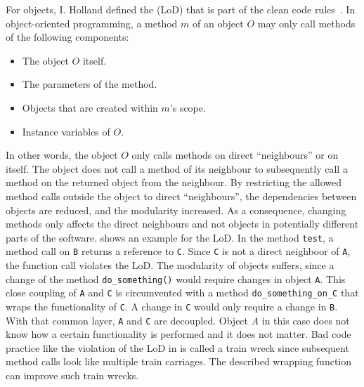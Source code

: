 For objects, I. Holland defined the  (LoD) that is part of the clean code rules~\cite{lieberherr_assuring_1989}.
In object-oriented programming, a method $m$ of an object $O$ may only call methods of the following components:
\begin{itemize}
    \item The object $O$ itself.
    \item The parameters of the method.
    \item Objects that are created within $m$'s scope.
    \item Instance variables of $O$.
\end{itemize}
In other words, the object $O$ only calls methods on direct \enquote{neighbours} or on itself. The object does not call a method of its neighbour to subsequently call a method on the returned object from the neighbour. By restricting the allowed method calls outside the object to direct \enquote{neighbours}, the dependencies between objects are reduced, and the modularity increased. As a consequence, changing methods only affects the direct neighbours and not objects in potentially different parts of the software. 
 shows an example for the LoD. In the method \texttt{test}, a method call on \texttt{B} returns a reference to \texttt{C}. Since \texttt{C} is not a direct neighboor of \texttt{A}, the function call violates the LoD. The modularity of objects suffers, since a change of the method \texttt{do\_something()} would require changes in object \texttt{A}. This close coupling of \texttt{A} and \texttt{C} is circumvented with a method \texttt{do\_something\_on\_C} that wraps the functionality of \texttt{C}. A change in \texttt{C} would only require a change in \texttt{B}. With that common layer, \texttt{A} and \texttt{C} are decoupled. Object \textit{A} in this case does not know how a certain functionality is performed and it does not matter.  
Bad code practice like the violation of the LoD in  is called a train wreck since subsequent method calls look like multiple train carriages. The described wrapping function can improve such train wrecks.

